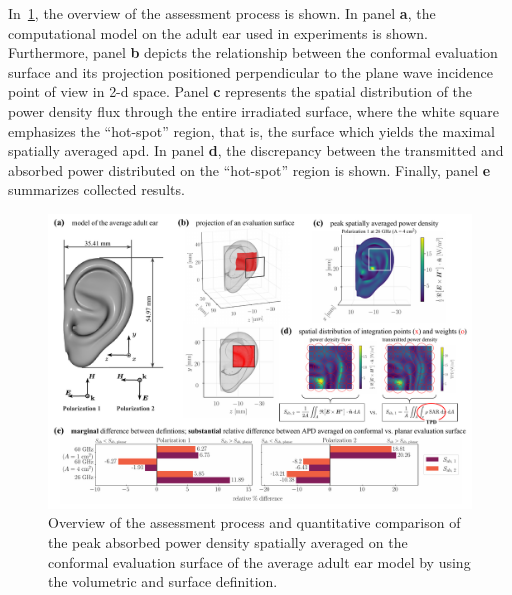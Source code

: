 In~\cref{fig:Kapetanovic2022JERM}, the overview of the assessment process is shown.
In panel \textbf{a}, the computational model on the adult ear used in experiments is shown.
Furthermore, panel \textbf{b} depicts the relationship between the conformal evaluation surface and its projection positioned perpendicular to the plane wave incidence point of view in \gls{2-d} space.
Panel \textbf{c} represents the spatial distribution of the power density flux through the entire irradiated surface, where the white square emphasizes the ``hot-spot'' region, that is, the surface which yields the maximal spatially averaged \gls{apd}.
In panel \textbf{d}, the discrepancy between the transmitted and absorbed power distributed on the ``hot-spot'' region is shown.
Finally, panel \textbf{e} summarizes collected results.
\begin{figure}[ht]
    \begin{center}  
    \includegraphics[width=\textwidth]{artwork/Kapetanovic2022JERM.pdf}
    \caption{Overview of the assessment process and quantitative comparison of the peak absorbed power density spatially averaged on the conformal evaluation surface of the average adult ear model by using the volumetric and surface definition.}
    \label{fig:Kapetanovic2022JERM}
    \end{center}
\end{figure}

